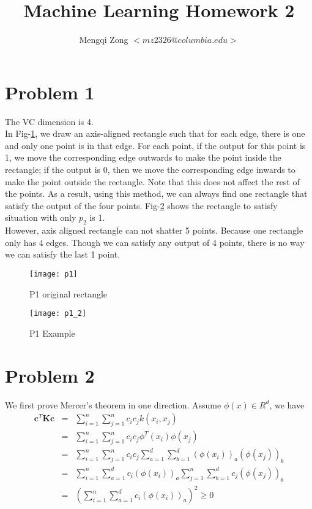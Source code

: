 \documentclass[12pt]{article}
\title{Machine Learning Homework 2}
\author{Mengqi Zong $<mz2326@columbia.edu>$}
\begin{document}
\maketitle

\setlength{\parindent}{0in}

\section*{Problem 1}

The VC dimension is 4. \\

In Fig-\ref{fig:p1}, we draw an axis-aligned rectangle such that for each edge, there is one and only one point is in that edge. For each point, if the output for this point is 1, we move the corresponding edge outwards to make the point inside the rectangle; if the output is 0, then we move the corresponding edge inwards to make the point outside the rectangle. Note that this does not affect the rest of the points. As a result, using this method, we can always find one rectangle that satisfy the output of the four points. Fig-\ref{fig:p1_2} shows the rectangle to satisfy situation with only $p_2$ is 1. \\

However, axis aligned rectangle can not shatter 5 points. Because one rectangle only has 4 edges. Though we can satisfy any output of 4 points, there is no way we can satisfy the last 1 point.

\begin{figure}[ht!]
  \centering
  \texttt{[image: p1]}
  \caption{P1 original rectangle \label{fig:p1}}
\end{figure}

\begin{figure}[ht!]
  \centering
  \texttt{[image: p1\_2]}
  \caption{P1 Example \label{fig:p1_2}}
\end{figure}

\section*{Problem 2}

We first prove Mercer's theorem in one direction. Assume $\phi(x) \in R^d$, we have
\begin{eqnarray*}
  \textbf{c}^T \textbf{Kc}
  &=& \sum_{i=1}^n \sum_{j=1}^n c_i c_j k(x_i,x_j) \\
  &=& \sum_{i=1}^n \sum_{j=1}^n c_i c_j \phi^T(x_i) \phi(x_j) \\
  &=& \sum_{i=1}^n \sum_{j=1}^n c_i c_j
  \sum_{a=1}^d \sum_{b=1}^d (\phi(x_i))_a (\phi(x_j))_b \\
  &=& \sum_{i=1}^n \sum_{a=1}^d c_i (\phi(x_i))_a
  \sum_{j=1}^n \sum_{b=1}^d c_j (\phi(x_j))_b \\
  &=& \left( \sum_{i=1}^n \sum_{a=1}^d c_i (\phi(x_i))_a \right)^2 \ge 0
\end{eqnarray*}
\end{document}
